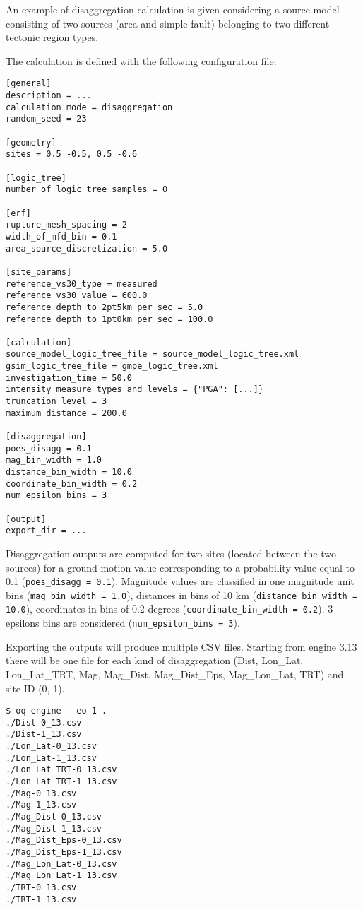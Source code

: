 An example of disaggregation calculation is given considering a source model
consisting of two sources (area and simple fault) belonging to two different
tectonic region types.

The calculation is defined with the following configuration file:

\begin{Verbatim}[frame=single, commandchars=\\\{\}, fontsize=\normalsize]
[general]
description = ...
calculation_mode = disaggregation
random_seed = 23

[geometry]
sites = 0.5 -0.5, 0.5 -0.6

[logic_tree]
number_of_logic_tree_samples = 0

[erf]
rupture_mesh_spacing = 2
width_of_mfd_bin = 0.1
area_source_discretization = 5.0

[site_params]
reference_vs30_type = measured
reference_vs30_value = 600.0
reference_depth_to_2pt5km_per_sec = 5.0
reference_depth_to_1pt0km_per_sec = 100.0

[calculation]
source_model_logic_tree_file = source_model_logic_tree.xml
gsim_logic_tree_file = gmpe_logic_tree.xml
investigation_time = 50.0
intensity_measure_types_and_levels = {"PGA": [...]}
truncation_level = 3
maximum_distance = 200.0

[disaggregation]
poes_disagg = 0.1
mag_bin_width = 1.0
distance_bin_width = 10.0
coordinate_bin_width = 0.2
num_epsilon_bins = 3

[output]
export_dir = ...
\end{Verbatim}

Disaggregation outputs are computed for two sites (located between the
two sources) for a ground motion value corresponding to a probability value
equal to 0.1 (\texttt{poes\_\-disagg = 0.1}). Magnitude values are classified
in one magnitude unit bins (\texttt{mag\_\-bin\_\-width = 1.0}), distances in
bins of 10 km (\texttt{distance\_\-bin\_\-width = 10.0}), coordinates in bins
of 0.2 degrees (\texttt{coordinate\_\-bin\_\-width = 0.2}). 3 epsilons bins
are considered (\texttt{num\_\-epsilon\_\-bins = 3}).

Exporting the outputs will produce multiple CSV files. Starting from
engine 3.13 there will be one file for each
kind of disaggregation (Dist, Lon\_Lat, Lon\_Lat\_TRT, Mag, Mag\_Dist,
Mag\_Dist\_Eps, Mag\_Lon\_Lat, TRT) and site ID (0, 1).

\begin{Verbatim}
$ oq engine --eo 1 .
./Dist-0_13.csv
./Dist-1_13.csv
./Lon_Lat-0_13.csv
./Lon_Lat-1_13.csv
./Lon_Lat_TRT-0_13.csv
./Lon_Lat_TRT-1_13.csv
./Mag-0_13.csv
./Mag-1_13.csv
./Mag_Dist-0_13.csv
./Mag_Dist-1_13.csv
./Mag_Dist_Eps-0_13.csv
./Mag_Dist_Eps-1_13.csv
./Mag_Lon_Lat-0_13.csv
./Mag_Lon_Lat-1_13.csv
./TRT-0_13.csv
./TRT-1_13.csv
\end{Verbatim}

